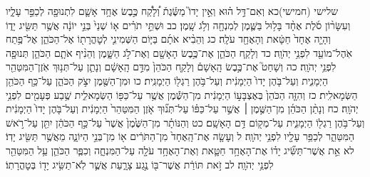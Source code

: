 \documentclass[twoside, openany, parskip=half, 11pt]{book}
\begin{document}
שלישי (חמישי)כא וְאִם־דַּ֣ל ה֗וּא וְאֵ֣ין יָדוֹ֮ מַשֶּׂ֒גֶת֒ וְ֠לָקַ֠ח כֶּ֣בֶשׂ אֶחָ֥ד אָשָׁ֛ם לִתְנוּפָ֖ה לְכַפֵּ֣ר עָלָ֑יו וְעִשָּׂר֨וֹן סֹ֜לֶת אֶחָ֨ד בָּל֥וּל בַּשֶּׁ֛מֶן לְמִנְחָ֖ה וְלֹ֥ג שָֽׁמֶן׃ כב וּשְׁתֵּ֣י תֹרִ֗ים א֤וֹ שְׁנֵי֙ בְּנֵ֣י יוֹנָ֔ה אֲשֶׁ֥ר תַּשִּׂ֖יג יָד֑וֹ וְהָיָ֤ה אֶחָד֙ חַטָּ֔את וְהָאֶחָ֖ד עֹלָֽה׃ כג וְהֵבִ֨יא אֹתָ֜ם בַּיּ֧וֹם הַשְּׁמִינִ֛י לְטׇהֳרָת֖וֹ אֶל־הַכֹּהֵ֑ן אֶל־פֶּ֥תַח אֹֽהֶל־מוֹעֵ֖ד לִפְנֵ֥י יְהֹוָֽה׃ כד וְלָקַ֧ח הַכֹּהֵ֛ן אֶת־כֶּ֥בֶשׂ הָאָשָׁ֖ם וְאֶת־לֹ֣ג הַשָּׁ֑מֶן וְהֵנִ֨יף אֹתָ֧ם הַכֹּהֵ֛ן תְּנוּפָ֖ה לִפְנֵ֥י יְהֹוָֽה׃ כה וְשָׁחַט֮ אֶת־כֶּ֣בֶשׂ הָֽאָשָׁם֒ וְלָקַ֤ח הַכֹּהֵן֙ מִדַּ֣ם הָֽאָשָׁ֔ם וְנָתַ֛ן עַל־תְּנ֥וּךְ אֹֽזֶן־הַמִּטַּהֵ֖ר הַיְמָנִ֑ית וְעַל־בֹּ֤הֶן יָדוֹ֙ הַיְמָנִ֔ית וְעַל־בֹּ֥הֶן רַגְל֖וֹ הַיְמָנִֽית׃ כו וּמִן־הַשֶּׁ֖מֶן יִצֹ֣ק הַכֹּהֵ֑ן עַל־כַּ֥ף הַכֹּהֵ֖ן הַשְּׂמָאלִֽית׃ כז וְהִזָּ֤ה הַכֹּהֵן֙ בְּאֶצְבָּע֣וֹ הַיְמָנִ֔ית מִן־הַשֶּׁ֕מֶן אֲשֶׁ֥ר עַל־כַּפּ֖וֹ הַשְּׂמָאלִ֑ית שֶׁ֥בַע פְּעָמִ֖ים לִפְנֵ֥י יְהֹוָֽה׃ כח וְנָתַ֨ן הַכֹּהֵ֜ן מִן־הַשֶּׁ֣מֶן ׀ אֲשֶׁ֣ר עַל־כַּפּ֗וֹ עַל־תְּנ֞וּךְ אֹ֤זֶן הַמִּטַּהֵר֙ הַיְמָנִ֔ית וְעַל־בֹּ֤הֶן יָדוֹ֙ הַיְמָנִ֔ית וְעַל־בֹּ֥הֶן רַגְל֖וֹ הַיְמָנִ֑ית עַל־מְק֖וֹם דַּ֥ם הָאָשָֽׁם׃ כט וְהַנּוֹתָ֗ר מִן־הַשֶּׁ֙מֶן֙ אֲשֶׁר֙ עַל־כַּ֣ף הַכֹּהֵ֔ן יִתֵּ֖ן עַל־רֹ֣אשׁ הַמִּטַּהֵ֑ר לְכַפֵּ֥ר עָלָ֖יו לִפְנֵ֥י יְהֹוָֽה׃ ל וְעָשָׂ֤ה אֶת־הָֽאֶחָד֙ מִן־הַתֹּרִ֔ים א֖וֹ מִן־בְּנֵ֣י הַיּוֹנָ֑ה מֵאֲשֶׁ֥ר תַּשִּׂ֖יג יָדֽוֹ׃ לא אֵ֣ת אֲשֶׁר־תַּשִּׂ֞יג יָד֗וֹ אֶת־הָאֶחָ֥ד חַטָּ֛את וְאֶת־הָאֶחָ֥ד עֹלָ֖ה עַל־הַמִּנְחָ֑ה וְכִפֶּ֧ר הַכֹּהֵ֛ן עַ֥ל הַמִּטַּהֵ֖ר לִפְנֵ֥י יְהֹוָֽה׃ לב זֹ֣את תּוֹרַ֔ת אֲשֶׁר־בּ֖וֹ נֶ֣גַע צָרָ֑עַת אֲשֶׁ֛ר לֹֽא־תַשִּׂ֥יג יָד֖וֹ בְּטׇהֳרָתֽוֹ׃
\end{document}
